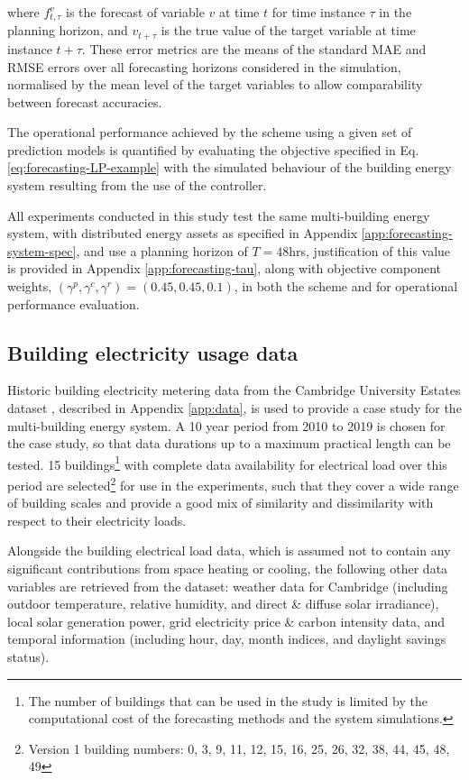 where $f^v_{t,\tau}$ is the forecast of variable $v$ at time $t$ for time instance $\tau$ in the planning horizon, and $v_{t+\tau}$ is the true value of the target variable at time instance $t+\tau$. These error metrics are the means of the standard MAE and RMSE errors over all forecasting horizons considered in the simulation, normalised by the mean level of the target variables to allow comparability between forecast accuracies.

The operational performance achieved by the  scheme using a given set of prediction models is quantified by evaluating the objective specified in Eq. \ref{eq:forecasting-LP-example} with the simulated behaviour of the building energy system resulting from the use of the controller.

All experiments conducted in this study test the same multi-building energy system, with distributed energy assets as specified in Appendix \ref{app:forecasting-system-spec}, and use a planning horizon of $T=48$hrs, justification of this value is provided in Appendix \ref{app:forecasting-tau}, along with objective component weights, $(\gamma^p,\gamma^c,\gamma^r) = (0.45,0.45,0.1)$, in both the  scheme and for operational performance evaluation.


\newpage
\subsection{Building electricity usage data}

Historic building electricity metering data from the Cambridge University Estates dataset \citep{langtry2024CambridgeUniversityEstates}, described in Appendix \ref{app:data}, is used to provide a case study for the multi-building energy system. A 10 year period from 2010 to 2019 is chosen for the case study, so that data durations up to a maximum practical length can be tested. 15 buildings\footnote{The number of buildings that can be used in the study is limited by the computational cost of the forecasting methods and the system simulations.} with complete data availability for electrical load over this period are selected\footnote{Version 1 building numbers: 0, 3, 9, 11, 12, 15, 16, 25, 26, 32, 38, 44, 45, 48, 49} for use in the experiments, such that they cover a wide range of building scales and provide a good mix of similarity and dissimilarity with respect to their electricity loads.

Alongside the building electrical load data, which is assumed not to contain any significant contributions from space heating or cooling, the following other data variables are retrieved from the dataset: weather data for Cambridge (including outdoor temperature, relative humidity, and direct \& diffuse solar irradiance), local solar generation power, grid electricity price \& carbon intensity data, and temporal information (including hour, day, month indices, and daylight savings status).

